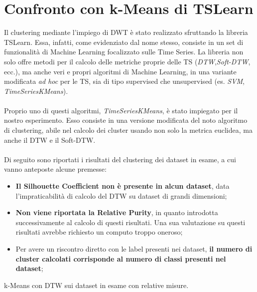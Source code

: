 \section{Confronto con k-Means di TSLearn}
Il clustering mediante l'impiego di DWT è stato realizzato sfruttando la libreria TSLearn.
Essa, infatti, come evidenziato dal nome stesso, consiste in un set di funzionalità di  Machine Learning focalizzato sulle Time Series.
La libreria non solo offre metodi per il calcolo delle metriche proprie delle TS (\textit{DTW},\textit{Soft-DTW}, ecc.), ma anche veri e propri algoritmi di Machine Learning, in una variante modificata \textit{ad hoc} per le TS, sia di tipo supervised che unsupervised (es. \textit{SVM}, \textit{TimeSeriesKMeans}).\\
\\
Proprio uno di questi algoritmi, \textit{TimeSeriesKMeans}, è stato impiegato per il nostro esperimento.
Esso consiste in una versione modificata del noto algoritmo di clustering, abile nel calcolo dei cluster usando non solo la metrica euclidea, ma anche il DTW e il Soft-DTW.\\
\\
Di seguito sono riportati i risultati del clustering dei dataset in esame, a cui vanno anteposte alcune premesse:
\begin{itemize}
	\item \textbf{Il Silhouette Coefficient non è presente in alcun dataset}, data l'impraticabilità di calcolo del DTW su dataset di grandi dimensioni;
	\item \textbf{Non viene riportata la Relative Purity}, in quanto introdotta successivamente al calcolo di questi risultati. Una sua valutazione su questi risultati avrebbe richiesto un computo troppo oneroso;
	\item Per avere un riscontro diretto con le label presenti nei dataset, \textbf{il numero di cluster calcolati corrisponde al numero di classi presenti nel dataset};
\end{itemize}

\begin{center}
	\begin{table}[H]
		\centering
		\caption{k-Means con DTW sui dataset in esame con relative misure.}
	\end{table}
\end{center}


